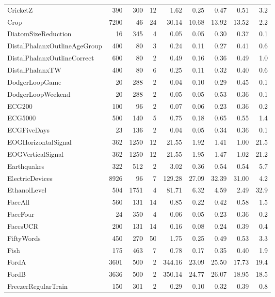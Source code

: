 \documentclass[11pt,landscape]{article}
\begin{document}
\begin{longtable}{lrrrrrrrr}
CricketZ & 390 & 300 & 12 & 1.62 & 0.25 & 0.47 & 0.51 & 3.2 \\
\rowcolor{fastrow}Crop & 7200 & 46 & 24 & 30.14 & 10.68 & 13.92 & 13.52 & 2.2 \\
DiatomSizeReduction & 16 & 345 & 4 & 0.05 & 0.05 & 0.30 & 0.37 & 0.1 \\
DistalPhalanxOutlineAgeGroup & 400 & 80 & 3 & 0.24 & 0.11 & 0.27 & 0.41 & 0.6 \\
DistalPhalanxOutlineCorrect & 600 & 80 & 2 & 0.49 & 0.16 & 0.36 & 0.49 & 1.0 \\
DistalPhalanxTW & 400 & 80 & 6 & 0.25 & 0.11 & 0.32 & 0.40 & 0.6 \\
DodgerLoopGame & 20 & 288 & 2 & 0.04 & 0.10 & 0.29 & 0.45 & 0.1 \\
DodgerLoopWeekend & 20 & 288 & 2 & 0.05 & 0.05 & 0.53 & 0.36 & 0.1 \\
ECG200 & 100 & 96 & 2 & 0.07 & 0.06 & 0.23 & 0.36 & 0.2 \\
ECG5000 & 500 & 140 & 5 & 0.75 & 0.18 & 0.65 & 0.55 & 1.4 \\
ECGFiveDays & 23 & 136 & 2 & 0.04 & 0.05 & 0.34 & 0.36 & 0.1 \\
\rowcolor{fastrow}EOGHorizontalSignal & 362 & 1250 & 12 & 21.55 & 1.92 & 1.41 & 1.00 & 21.5 \\
\rowcolor{fastrow}EOGVerticalSignal & 362 & 1250 & 12 & 21.55 & 1.95 & 1.47 & 1.02 & 21.2 \\
Earthquakes & 322 & 512 & 2 & 3.02 & 0.36 & 0.54 & 0.54 & 5.7 \\
\rowcolor{fastrow}ElectricDevices & 8926 & 96 & 7 & 129.28 & 27.09 & 32.39 & 31.00 & 4.2 \\
\rowcolor{fastrow}EthanolLevel & 504 & 1751 & 4 & 81.71 & 6.32 & 4.59 & 2.49 & 32.9 \\
FaceAll & 560 & 131 & 14 & 0.85 & 0.22 & 0.42 & 0.58 & 1.5 \\
FaceFour & 24 & 350 & 4 & 0.06 & 0.05 & 0.23 & 0.36 & 0.2 \\
FacesUCR & 200 & 131 & 14 & 0.16 & 0.08 & 0.24 & 0.39 & 0.4 \\
FiftyWords & 450 & 270 & 50 & 1.75 & 0.25 & 0.49 & 0.53 & 3.3 \\
Fish & 175 & 463 & 7 & 0.78 & 0.17 & 0.35 & 0.40 & 1.9 \\
\rowcolor{fastrow}FordA & 3601 & 500 & 2 & 344.16 & 23.09 & 25.50 & 17.73 & 19.4 \\
\rowcolor{fastrow}FordB & 3636 & 500 & 2 & 350.14 & 24.77 & 26.07 & 18.95 & 18.5 \\
FreezerRegularTrain & 150 & 301 & 2 & 0.29 & 0.10 & 0.32 & 0.39 & 0.8 \\

\end{longtable}
\end{document}
